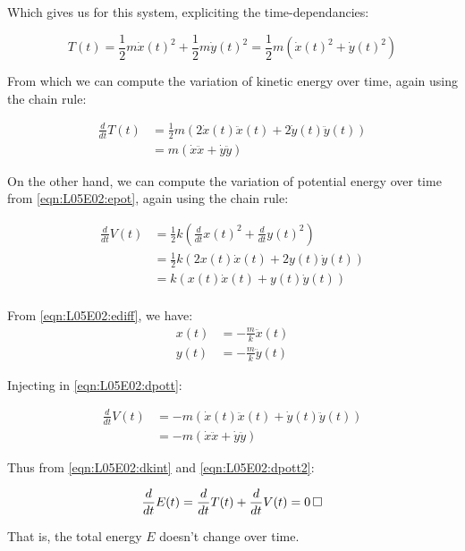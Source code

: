 \documentclass[solutions.tex]{subfiles}
\begin{document}
Which gives us for this system, expliciting the time-dependancies:

\begin{equation}
	T(t)=\frac12 m \dot{x}(t)^2 + \frac12 m \dot{y}(t)^2=\frac12m(\dot{x}(t)^2+\dot{y}(t)^2)
\end{equation}

From which we can compute the variation of kinetic energy
over time, again using the chain rule:

\begin{equation}
	\label{eqn:L05E02:dkint}
	\begin{aligned}
		\frac{d}{dt}T(t) &= \frac12m(2\dot{x}(t)\ddot{x}(t)+2\dot{y}(t)\ddot{y}(t)) \\
		~ &= m(\dot{x}\ddot{x}+\dot{y}\ddot{y})
	\end{aligned}
\end{equation}

On the other hand, we can compute the variation of
potential energy over time from \eqref{eqn:L05E02:epot},
again using the chain rule:

\begin{equation}
	\label{eqn:L05E02:dpott}
	\begin{aligned}
		\frac{d}{dt}V(t) &= \frac12k(\frac{d}{dt}x(t)^2+\frac{d}{dt}y(t)^2) \\
		~ &= \frac12k(2x(t)\dot{x}(t)+2y(t)\dot{y}(t))\\
		~ &= k(x(t)\dot{x}(t)+y(t)\dot{y}(t))\\
	\end{aligned}
\end{equation}

From \eqref{eqn:L05E02:ediff}, we have:
\begin{equation}
	\begin{aligned}
		x(t) &= -\frac{m}{k}\ddot{x}(t) \\
		y(t) &= -\frac{m}{k}\ddot{y}(t)
	\end{aligned}
\end{equation}

Injecting in \eqref{eqn:L05E02:dpott}:

\begin{equation}
	\label{eqn:L05E02:dpott2}
	\begin{aligned}
		\frac{d}{dt}V(t) &= -m(\dot{x}(t)\ddot{x}(t)+\dot{y}(t)\ddot{y}(t))\\
		~ &= -m(\dot{x}\ddot{x}+\dot{y}\ddot{y})
	\end{aligned}
\end{equation}

Thus from \eqref{eqn:L05E02:dkint} and \eqref{eqn:L05E02:dpott2}:

\begin{equation}
	\frac{d}{dt}E(t) = \frac{d}{dt}T(t) + \frac{d}{dt}V(t) = 0 \qed
\end{equation}

That is, the total energy $E$ doesn't change over time.
\end{document}
